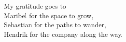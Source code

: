 \begin{center}
    
\vspace*{4cm}
My gratitude goes to \\
Maribel for the space to grow, \\
Sebastian for the paths to wander, \\
Hendrik for the company along the way.
\end{center}